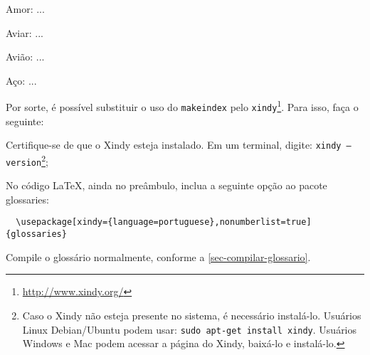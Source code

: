 \documentclass[
	12pt,				%
	openright,			%
	twoside,			%
	a4paper,			%
	english,			%
	french,				%
	spanish,			%
	brazil,				%
	]{abntex2}
\begin{document}
\begin{alineas}
 \item Amor: ...
 \item Aviar: ...
 \item Avião: ...
 \item Aço: ...
\end{alineas}

Por sorte, é possível substituir o uso do \texttt{makeindex}
pelo \texttt{xindy}\footnote{\url{http://www.xindy.org/}}. Para isso, faça o
seguinte:

\begin{alineas}
  \item Certifique-se de que o Xindy esteja instalado. Em um terminal, digite:
  \texttt{xindy --version}\footnote{Caso o Xindy não esteja presente no sistema, é necessário
    instalá-lo. Usuários Linux Debian/Ubuntu podem usar: \texttt{sudo
    apt-get install xindy}. Usuários Windows e Mac podem acessar a página do
    Xindy, baixá-lo e instalá-lo.};
  \item No código LaTeX, ainda no preâmbulo, inclua a seguinte opção ao pacote glossaries:
  \begin{verbatim}
  \usepackage[xindy={language=portuguese},nonumberlist=true]{glossaries}
  \end{verbatim}
  \item Compile o glossário normalmente, conforme a
  \autoref{sec-compilar-glossario}.
\end{alineas}



 
 
\postextual
 
 

 

\renewcommand{\glossaryname}{Glossário}
\renewcommand{\glossarypreamble}{Esta é a descrição do glossário. Experimente
visualizar outros estilos de glossários, como o \texttt{altlisthypergroup},
por exemplo.\\
\\}
\end{document}
